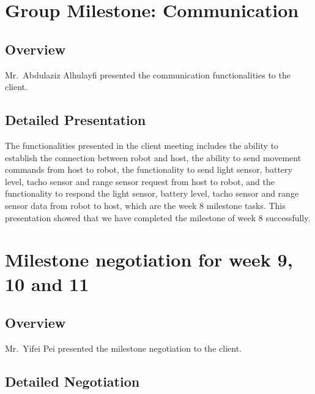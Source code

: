 \documentclass[12pt, a4paper]{article}
\begin{document}
\section{Group Milestone: Communication}

\subsection{Overview}

Mr.~Abdulaziz Alhulayfi presented the communication functionalities to the client.

\subsection{Detailed Presentation}

The functionalities presented in the client meeting includes the ability to establish the connection between robot and host, the ability to send movement commands from host to robot, the functionality to send light sensor, battery level, tacho sensor and range sensor request from host to robot, and the functionality to respond the light sensor, battery level, tacho sensor and range sensor data from robot to host, which are the week 8 milestone tasks. This presentation showed that we have completed the milestone of week 8 successfully.


\section{Milestone negotiation for week 9, 10 and 11}

\subsection{Overview}

Mr.~Yifei Pei presented the milestone negotiation to the client.

\subsection{Detailed Negotiation}
\end{document}
